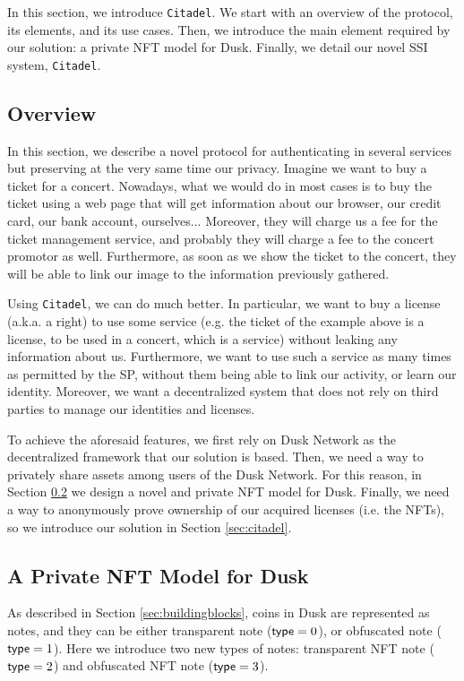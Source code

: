 In this section, we introduce \verb!Citadel!. We start with an overview of the protocol, its elements, and its use cases. Then, we introduce the main element required by our solution: a private NFT model for Dusk. Finally, we detail our novel SSI system, \verb!Citadel!.

\subsection{Overview}

In this section, we describe a novel protocol for authenticating in several services but preserving at the very same time our privacy. Imagine we want to buy a ticket for a concert. Nowadays, what we would do in most cases is to buy the ticket using a web page that will get information about our browser, our credit card, our bank account, ourselves... Moreover, they will charge us a fee for the ticket management service, and probably they will charge a fee to the concert promotor as well. Furthermore, as soon as we show the ticket to the concert, they will be able to link our image to the information previously gathered.

Using \verb!Citadel!, we can do much better. In particular, we want to buy a license (a.k.a. a right) to use some service (e.g. the ticket of the example above is a license, to be used in a concert, which is a service) without leaking any information about us. Furthermore, we want to use such a service as many times as permitted by the SP, without them being able to link our activity, or learn our identity. Moreover, we want a decentralized system that does not rely on third parties to manage our identities and licenses.

To achieve the aforesaid features, we first rely on Dusk Network as the decentralized framework that our solution is based. Then, we need a way to privately share assets among users of the Dusk Network. For this reason, in Section \ref{sec:privatenft} we design a novel and private NFT model for Dusk. Finally, we need a way to anonymously prove ownership of our acquired licenses (i.e. the NFTs), so we introduce our solution in Section \ref{sec:citadel}.

\subsection{A Private NFT Model for Dusk}
\label{sec:privatenft}

As described in Section \ref{sec:buildingblocks}, coins in Dusk are represented as notes, and they can be either transparent note ($\mathsf{type} = 0$), or obfuscated note ($\mathsf{type} = 1$). Here we introduce two new types of notes: transparent NFT note ($\mathsf{type} = 2$) and obfuscated NFT note ($\mathsf{type} = 3$). 

